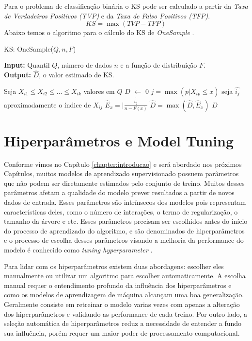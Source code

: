 Para o problema de classificação binária o KS pode ser calculado a partir da \textit{Taxa de Verdadeiros Positivos (TVP)} e da \textit{Taxa de Falso Positivos (TFP)}.
\begin{equation}
    KS = \max(TVP - TFP)
\end{equation}
Abaixo temos o algoritmo para o cálculo do KS de \textit{OneSample} \cite{ashwin}.
\begin{algorithm}[H]
\caption{KS: OneSample($Q,n,F$)}\label{algoritmo:ks}
\textbf{Input:} Quantil $Q$, número de dados $n$ e a função de distribuição $F$. \\
\textbf{Output:} $\hat{D}$, o valor estimado de KS. \\
\begin{algorithmic}[1]
\State Seja $X_{i1} \leq X_{i2} \leq ... \leq X_{ik}$ valores em $Q$
\State $\hat{D}$ $\leftarrow$ $0$ 
\State $j = \max(p | X_{ip}\leq x)$
\State seja $\hat{i_j}$ aproximadamente o índice de $X_{ij}$
\State $\hat{E}_x = | \frac{\hat{i_j}}{n - F(x)}$
\State $\hat{D} = \max(\hat{D},\hat{E}_x)$
\EndIf
\State \Return $\hat{D}$
\end{algorithmic}
\end{algorithm}


\section{Hiperparâmetros e Model Tuning}
Conforme vimos no Capítulo \ref{chapter:introducao} e será abordado nos próximos Capítulos, muitos modelos de aprendizado supervisionado possuem parâmetros que não podem ser diretamente estimados pelo conjunto de treino. Muitos desses parâmetros afetam a qualidade do modelo prever resultados a partir de novos dados de entrada. Esses parâmetros são intrínsecos dos modelos pois representam características deles, como o número de interações, o termo de regularização, o tamanho da árvore e etc. Esses parâmetros precisam ser escolhidos antes do início do processo de aprendizado do algoritmo, e são denominados de hiperparâmetros e o processo de escolha desses parâmetros visando a melhoria da performance do modelo é conhecido como \textit{tuning hyperparameter} \cite{ian,kuhn,tuning:artigo,hyper:op:theory,grid:book,neural:op}.

Para lidar com os hiperparâmetros existem duas abordagens: escolher eles manualmente 
ou utilizar um algoritmo para escolher automaticamente. A escolha manual requer o entendimento profundo da influência dos hiperparâmetros e como os modelos de aprendizagem de máquina alcançam uma boa generalização. Geralmente consiste em retreinar o modelo varias vezes com apenas a alteração dos hiperparâmetros e validando as performance de cada treino. Por outro lado, a seleção automática de hiperparâmetros reduz a necessidade de entender a fundo sua influência, porém requer um maior poder de processamento computacional.

